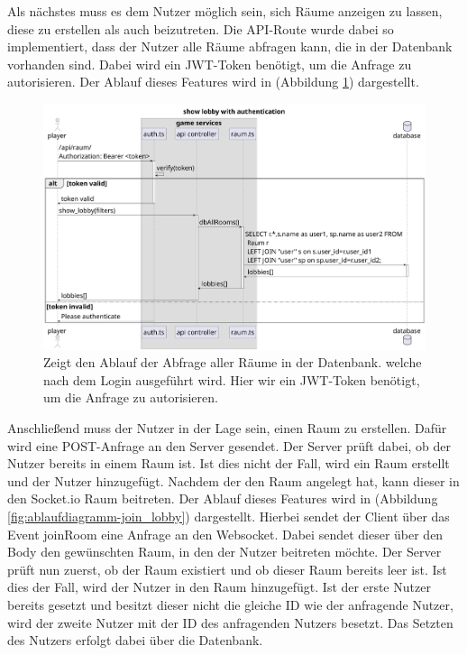 \documentclass[
]{article}
\begin{document}
Als nächstes muss es dem Nutzer möglich sein, sich Räume anzeigen zu lassen, diese zu erstellen als auch beizutreten.
Die API-Route wurde dabei so implementiert, dass der Nutzer alle Räume abfragen kann, die in der Datenbank vorhanden sind.
Dabei wird ein JWT-Token benötigt, um die Anfrage zu autorisieren. Der Ablauf dieses Features wird in (Abbildung \ref{fig:ablaufdiagramm-show_lobby}) dargestellt.

\begin{figure}[H]
	\centering
	\includegraphics[width=\textwidth ]{resources/show_lobby.pdf}
	\caption{Zeigt den Ablauf der Abfrage aller Räume in der Datenbank. welche nach dem Login ausgeführt wird. Hier wir ein JWT-Token benötigt, um die Anfrage zu autorisieren.}
	\label{fig:ablaufdiagramm-show_lobby}
\end{figure}

Anschließend muss der Nutzer in der Lage sein, einen Raum zu erstellen. Dafür wird eine POST-Anfrage an den Server gesendet.
Der Server prüft dabei, ob der Nutzer bereits in einem Raum ist. Ist dies nicht der Fall, wird ein Raum erstellt und der Nutzer hinzugefügt.
Nachdem der den Raum angelegt hat, kann dieser in den Socket.io Raum beitreten.
Der Ablauf dieses Features wird in (Abbildung \ref{fig:ablaufdiagramm-join_lobby}) dargestellt.
Hierbei sendet der Client über das Event joinRoom eine Anfrage an den Websocket. Dabei sendet dieser über den
Body den gewünschten Raum, in den der Nutzer beitreten möchte. Der Server prüft nun zuerst, ob der Raum existiert
und ob dieser Raum bereits leer ist. Ist dies der Fall, wird der Nutzer in den Raum hinzugefügt. 
Ist der erste Nutzer bereits gesetzt und besitzt dieser nicht die gleiche ID wie der anfragende Nutzer,
wird der zweite Nutzer mit der ID des anfragenden Nutzers besetzt.
Das Setzten des Nutzers erfolgt dabei über die Datenbank.
\end{document}
